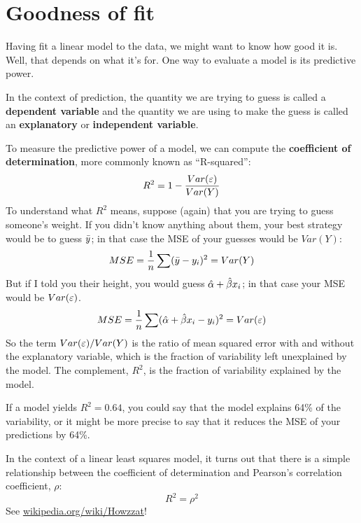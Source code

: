 \documentclass[12pt]{book}
\begin{document}
\section{Goodness of fit}


Having fit a linear model to the data, we might want to know how good
it is.  Well, that depends on what it's for.  One way to evaluate a
model is its predictive power.

In the context of prediction, the quantity we are trying to guess is
called a {\bf dependent variable} and the quantity we are using to
make the guess is called an {\bf explanatory} or {\bf independent
  variable}.



To measure the predictive power of a model, we can compute the {\bf
  coefficient of determination}, more commonly known as ``R-squared'':
%
\[ R^2 = 1 - \frac{Var(\varepsilon)}{Var(Y)}\]
%
To understand what $R^2$ means, suppose (again) that you are trying
to guess someone's weight.  If you didn't know anything about them,
your best strategy would be to guess $\bar{y}$; in
that case the MSE of your guesses would be $Var(Y)$:
%
\[ MSE = \frac{1}{n} \sum (\bar{y} - y_i)^2 = Var(Y) \]
%
But if I told you their height, you would guess $\hat{\alpha} +
\hat{\beta} x_i$; in that case your MSE would be $Var(\varepsilon)$.
%
\[ MSE = 
\frac{1}{n} \sum (\hat{\alpha} + \hat{\beta} x_i - y_i)^2 =
Var(\varepsilon) \]
%
So the term $Var(\varepsilon)/Var(Y)$ is the ratio of mean squared error with
and without the explanatory variable, which is the fraction of
variability left unexplained by the model.  The complement, $R^2$,
is the fraction of variability explained by the model.


If a model yields $R^2 = 0.64$, you could say that the model explains
64\% of the variability, or it might be more precise to say that it
reduces the MSE of your predictions by 64\%.

In the context of a linear least squares model, it turns out that
there is a simple relationship between the coefficient of
determination and Pearson's correlation coefficient, $\rho$:
%
\[ R^2 = \rho^2 \]
%
See \url{wikipedia.org/wiki/Howzzat}!
\end{document}
